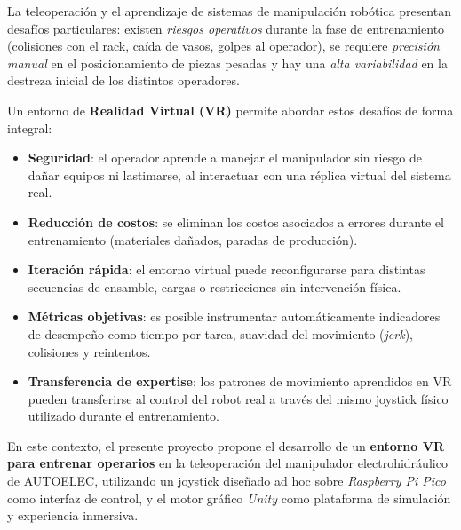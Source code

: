 La teleoperación y el aprendizaje de sistemas de manipulación robótica presentan desafíos particulares: existen \textit{riesgos operativos} durante la fase de entrenamiento (colisiones con el rack, caída de vasos, golpes al operador), se requiere \textit{precisión manual} en el posicionamiento de piezas pesadas y hay una \textit{alta variabilidad} en la destreza inicial de los distintos operadores.

Un entorno de \textbf{Realidad Virtual (VR)} permite abordar estos desafíos de forma integral:

\begin{itemize}
    \item \textbf{Seguridad}: el operador aprende a manejar el manipulador sin riesgo de dañar equipos ni lastimarse, al interactuar con una réplica virtual del sistema real.
    \item \textbf{Reducción de costos}: se eliminan los costos asociados a errores durante el entrenamiento (materiales dañados, paradas de producción).
    \item \textbf{Iteración rápida}: el entorno virtual puede reconfigurarse para distintas secuencias de ensamble, cargas o restricciones sin intervención física.
    \item \textbf{Métricas objetivas}: es posible instrumentar automáticamente indicadores de desempeño como tiempo por tarea, suavidad del movimiento (\textit{jerk}), colisiones y reintentos.
    \item \textbf{Transferencia de expertise}: los patrones de movimiento aprendidos en VR pueden transferirse al control del robot real a través del mismo joystick físico utilizado durante el entrenamiento.
\end{itemize}

En este contexto, el presente proyecto propone el desarrollo de un \textbf{entorno VR para entrenar operarios} en la teleoperación del manipulador electrohidráulico de AUTOELEC, utilizando un joystick diseñado ad hoc sobre \textit{Raspberry Pi Pico} como interfaz de control, y el motor gráfico \textit{Unity} como plataforma de simulación y experiencia inmersiva.
